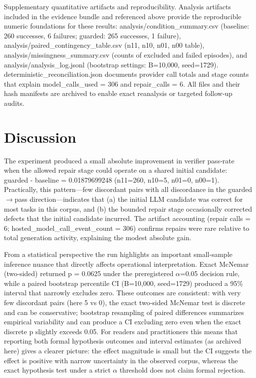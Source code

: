 \documentclass[conference]{IEEEtran}
\begin{document}
Supplementary quantitative artifacts and reproducibility. Analysis artifacts included in the evidence bundle and referenced above provide the reproducible numeric foundations for these results: analysis/condition\_summary.csv (baseline: 260 successes, 6 failures; guarded: 265 successes, 1 failure), analysis/paired\_contingency\_table.csv (n11, n10, n01, n00 table), analysis/missingness\_summary.csv (counts of excluded and failed episodes), and analysis/analysis\_log.jsonl (bootstrap settings: B=10,000, seed=1729). deterministic\_reconciliation.json documents provider call totals and stage counts that explain model\_calls\_used = 306 and repair\_calls = 6. All files and their hash manifests are archived to enable exact reanalysis or targeted follow‑up audits.

\section{Discussion}
The experiment produced a small absolute improvement in verifier pass‑rate when the allowed repair stage could operate on a shared initial candidate: guarded - baseline = 0.01879699248 (n11=260, n10=5, n01=0, n00=1). Practically, this pattern---few discordant pairs with all discordance in the guarded\ensuremath{\rightarrow}pass direction---indicates that (a) the initial LLM candidate was correct for most tasks in this corpus, and (b) the bounded repair stage occasionally corrected defects that the initial candidate incurred. The artifact accounting (repair calls = 6; hosted\_model\_call\_event\_count = 306) confirms repairs were rare relative to total generation activity, explaining the modest absolute gain.

From a statistical perspective the run highlights an important small‑sample inference nuance that directly affects operational interpretation. Exact McNemar (two‑sided) returned p = 0.0625 under the preregistered \ensuremath{\alpha}=0.05 decision rule, while a paired bootstrap percentile CI (B=10,000, seed=1729) produced a 95\% interval that narrowly excludes zero. These outcomes are consistent: with very few discordant pairs (here 5 vs 0), the exact two‑sided McNemar test is discrete and can be conservative; bootstrap resampling of paired differences summarizes empirical variability and can produce a CI excluding zero even when the exact discrete p slightly exceeds 0.05. For readers and practitioners this means that reporting both formal hypothesis outcomes and interval estimates (as archived here) gives a clearer picture: the effect magnitude is small but the CI suggests the effect is positive with narrow uncertainty in the observed corpus, whereas the exact hypothesis test under a strict \ensuremath{\alpha} threshold does not claim formal rejection.
\end{document}
